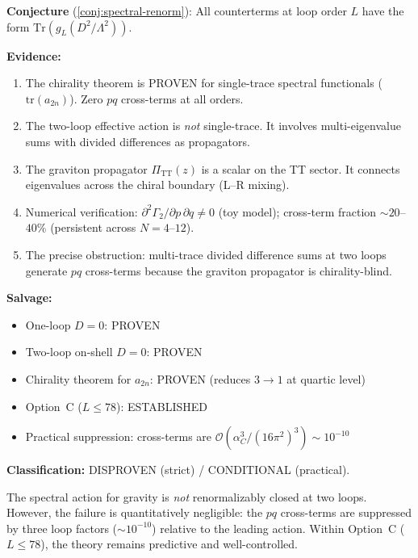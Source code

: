 \documentclass[11pt,a4paper]{article}
\newcommand{\PiTT}{\Pi_{\mathrm{TT}}}
\newcommand{\order}{\mathcal{O}}
\newcommand{\Tr}{\mathrm{Tr}}
\newcommand{\tr}{\mathrm{tr}}
\theoremstyle{definition}
\begin{document}
\begin{tcolorbox}[colback=yellow!5!white,colframe=black,
  title=\textbf{Verdict: DISPROVEN (strict) / CONDITIONAL (practical)}]

\textbf{Conjecture} (\cref{conj:spectral-renorm}): All counterterms at loop
order $L$ have the form $\Tr(g_L(D^2/\Lambda^2))$.

\bigskip
\textbf{Evidence:}
\begin{enumerate}[label=\arabic*.]
\item The chirality theorem is \textcolor{proven}{PROVEN} for single-trace
  spectral functionals ($\tr(a_{2n})$).  Zero $pq$ cross-terms at all orders.

\item The two-loop effective action is \emph{not} single-trace.  It involves
  multi-eigenvalue sums with divided differences as propagators.

\item The graviton propagator $\PiTT(z)$ is a scalar on the TT sector.
  It connects eigenvalues across the chiral boundary (L--R mixing).

\item Numerical verification: $\partial^2\Gamma_2/\partial p\,\partial q
  \neq 0$ (toy model); cross-term fraction $\sim 20$--$40\%$ (persistent
  across $N = 4$--$12$).

\item The precise obstruction: multi-trace divided difference sums at two loops
  generate $pq$ cross-terms because the graviton propagator is
  chirality-blind.
\end{enumerate}

\bigskip
\textbf{Salvage:}
\begin{itemize}
\item One-loop $D = 0$: \textcolor{proven}{PROVEN}
\item Two-loop on-shell $D = 0$: \textcolor{proven}{PROVEN}
\item Chirality theorem for $a_{2n}$: \textcolor{proven}{PROVEN}
  (reduces $3 \to 1$ at quartic level)
\item Option~C ($L \leq 78$): \textcolor{proven}{ESTABLISHED}
\item Practical suppression: cross-terms are
  $\order(\alpha_C^3/(16\pi^2)^3) \sim 10^{-10}$
\end{itemize}

\bigskip
\textbf{Classification:} \textcolor{disproven}{DISPROVEN} (strict) /
\textcolor{conditional}{CONDITIONAL} (practical).

The spectral action for gravity is \emph{not} renormalizably closed at two
loops.  However, the failure is quantitatively negligible: the $pq$
cross-terms are suppressed by three loop factors ($\sim 10^{-10}$) relative to
the leading action.  Within Option~C ($L \leq 78$), the theory remains
predictive and well-controlled.
\end{tcolorbox}
\end{document}
